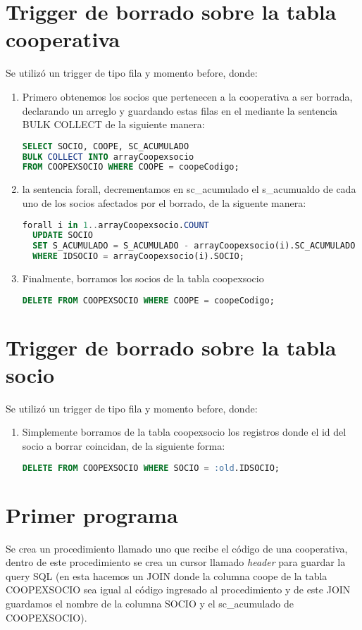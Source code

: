 \documentclass{article}
\begin{document}
\section{Trigger de borrado sobre la tabla cooperativa}
Se utilizó un trigger de tipo fila y momento before, donde:
\begin{enumerate}
    \item Primero obtenemos los socios que pertenecen a la cooperativa a ser borrada, declarando un arreglo y guardando estas filas en el mediante la sentencia BULK COLLECT de la siguiente manera:
    \begin{lstlisting}[language=SQL]
SELECT SOCIO, COOPE, SC_ACUMULADO 
BULK COLLECT INTO arrayCoopexsocio
FROM COOPEXSOCIO WHERE COOPE = coopeCodigo;   \end{lstlisting}
    \item la sentencia forall, decrementamos en sc\_acumulado  el s\_acumualdo de cada uno de los socios afectados por el borrado, de la siguente manera:
    \begin{lstlisting}[language=SQL]
forall i in 1..arrayCoopexsocio.COUNT
  UPDATE SOCIO 
  SET S_ACUMULADO = S_ACUMULADO - arrayCoopexsocio(i).SC_ACUMULADO
  WHERE IDSOCIO = arrayCoopexsocio(i).SOCIO;\end{lstlisting}
  \item Finalmente, borramos los socios de la tabla coopexsocio
  \begin{lstlisting}[language=SQL]
DELETE FROM COOPEXSOCIO WHERE COOPE = coopeCodigo;    \end{lstlisting}
\end{enumerate}
\section{Trigger de borrado sobre la tabla socio}
Se utilizó un trigger de tipo fila y momento before, donde:
\begin{enumerate}
    \item Simplemente borramos de la tabla coopexsocio los registros donde el id del socio a borrar coincidan, de la siguiente forma:
    \begin{lstlisting}[language=SQL]
DELETE FROM COOPEXSOCIO WHERE SOCIO = :old.IDSOCIO;    \end{lstlisting}
\end{enumerate}
\section{Primer programa}
Se crea un procedimiento llamado uno que recibe el código de una cooperativa, dentro de este procedimiento se crea un cursor llamado \emph{header} para guardar la query SQL (en esta hacemos un JOIN donde la columna coope de la tabla COOPEXSOCIO sea igual al código ingresado al procedimiento y de este JOIN guardamos el nombre de la columna SOCIO y el sc\_acumulado de COOPEXSOCIO).
\end{document}
